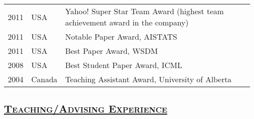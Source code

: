 \documentclass[10pt,twoside,letterpaper]{article}
\newcommand{\tabrowsep}{\vspace{1mm}}
\begin{document}
\begin{center}
\begin{tabular}{p{10mm} p{10mm} p{130mm}}
2011 & USA & {Yahoo! Super Star Team Award} (highest team achievement award in the company) \tabrowsep \\
2011 & USA & {Notable Paper Award, AISTATS} \tabrowsep \\
2011 & USA & {Best Paper Award, WSDM} \tabrowsep \\
2008 & USA & {Best Student Paper Award, ICML} \tabrowsep \\
2004 & Canada & {Teaching Assistant Award, University of Alberta}
\end{tabular}
\end{center}

\subsection*{\textsc{\underline{Teaching/Advising Experience}}}
\end{document}
